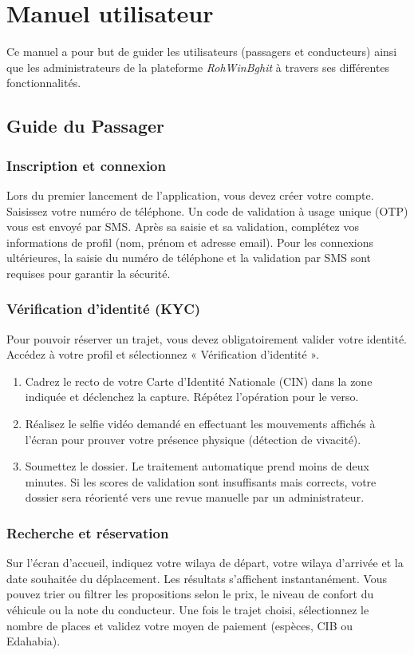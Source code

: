 \chapter{Manuel utilisateur}
\label{annexe:manuel}

Ce manuel a pour but de guider les utilisateurs (passagers et conducteurs) ainsi que les administrateurs de la plateforme \textit{RohWinBghit} à travers ses différentes fonctionnalités.

\section{Guide du Passager}
\label{sec:guide-passager}

\subsection{Inscription et connexion}
Lors du premier lancement de l'application, vous devez créer votre compte. Saisissez votre numéro de téléphone. Un code de validation à usage unique (OTP) vous est envoyé par SMS. Après sa saisie et sa validation, complétez vos informations de profil (nom, prénom et adresse email). Pour les connexions ultérieures, la saisie du numéro de téléphone et la validation par SMS sont requises pour garantir la sécurité.

\subsection{Vérification d'identité (KYC)}
Pour pouvoir réserver un trajet, vous devez obligatoirement valider votre identité. Accédez à votre profil et sélectionnez « Vérification d'identité ».
\begin{enumerate}
  \item Cadrez le recto de votre Carte d'Identité Nationale (CIN) dans la zone indiquée et déclenchez la capture. Répétez l'opération pour le verso.
  \item Réalisez le selfie vidéo demandé en effectuant les mouvements affichés à l'écran pour prouver votre présence physique (détection de vivacité).
  \item Soumettez le dossier. Le traitement automatique prend moins de deux minutes. Si les scores de validation sont insuffisants mais corrects, votre dossier sera réorienté vers une revue manuelle par un administrateur.
\end{enumerate}

\subsection{Recherche et réservation}
Sur l'écran d'accueil, indiquez votre wilaya de départ, votre wilaya d'arrivée et la date souhaitée du déplacement. Les résultats s'affichent instantanément. Vous pouvez trier ou filtrer les propositions selon le prix, le niveau de confort du véhicule ou la note du conducteur. Une fois le trajet choisi, sélectionnez le nombre de places et validez votre moyen de paiement (espèces, CIB ou Edahabia).


